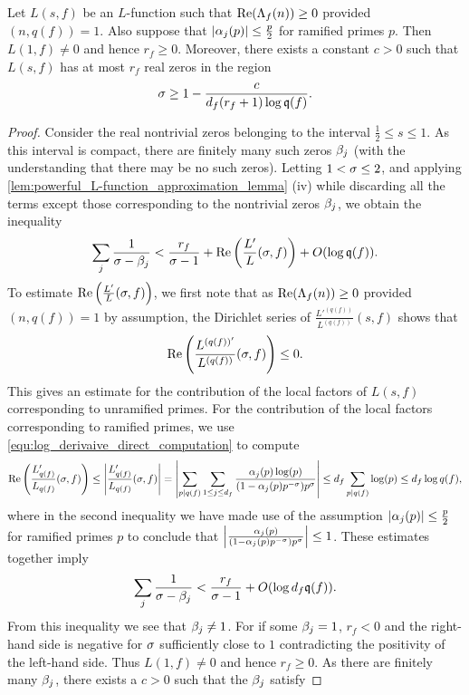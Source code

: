     \begin{lemma}\label{lem:non-vanshing_at_1_lemma}
      Let $L(s,f)$ be an $L$-function such that $\mathrm{Re}(\Lambda_{f}(n)) \ge 0$ provided $(n,q(f)) = 1$. Also suppose that $|\alpha_{j}(p)| \le \frac{p}{2}$ for ramified primes $p$. Then $L(1,f) \neq 0$ and hence $r_{f} \ge 0$. Moreover, there exists a constant $c > 0$ such that $L(s,f)$ has at most $r_{f}$ real zeros in the region
      \[
        \sigma \ge 1-\frac{c}{d_{f}(r_{f}+1)\log{\mathfrak{q}(f)}}.
      \]
    \end{lemma}
    \begin{proof}
      Consider the real nontrivial zeros belonging to the interval $\frac{1}{2} \le s \le 1$. As this interval is compact, there are finitely many such zeros $\beta_{j}$ (with the understanding that there may be no such zeros). Letting $1 < \sigma \le 2$, and applying \cref{lem:powerful_L-function_approximation_lemma} (iv) while discarding all the terms except those corresponding to the nontrivial zeros $\beta_{j}$, we obtain the inequality
      \[
        \sum_{j}\frac{1}{\sigma-\beta_{j}} < \frac{r_{f}}{\sigma-1}+\mathrm{Re}\left(\frac{L'}{L}(\sigma,f)\right)+O(\log{\mathfrak{q}(f)}).
      \]
      To estimate $\mathrm{Re}\left(\frac{L'}{L}(\sigma,f)\right)$, we first note that as $\mathrm{Re}(\Lambda_{f}(n)) \ge 0$ provided $(n,q(f)) = 1$ by assumption, the Dirichlet series of $\frac{L'^{(q(f))}}{L^{(q(f))}}(s,f)$ shows that
      \[
        \mathrm{Re}\left(\frac{L^{(q(f))'}}{L^{(q(f))}}(\sigma,f)\right) \le 0.
      \]
      This gives an estimate for the contribution of the local factors of $L(s,f)$ corresponding to unramified primes. For the contribution of the local factors corresponding to ramified primes, we use \cref{equ:log_derivaive_direct_computation} to compute
      \[
        \mathrm{Re}\left(\frac{L'_{q(f)}}{L_{q(f)}}(\sigma,f)\right) \le \left|\frac{L'_{q(f)}}{L_{q(f)}}(\sigma,f)\right| = \left|\sum_{p \mid q(f)}\sum_{1 \le j \le d_{f}}\frac{\alpha_{j}(p)\log(p)}{(1-\alpha_{j}(p)p^{-\sigma})p^{\sigma}}\right| \le d_{f}\sum_{p \mid q(f)}\log(p) \le d_{f}\log{q(f)},
      \]
      where in the second inequality we have made use of the assumption $|\alpha_{j}(p)| \le \frac{p}{2}$ for ramified primes $p$ to conclude that $\left|\frac{\alpha_{j}(p)}{(1-\alpha_{j}(p)p^{-\sigma})p^{\sigma}}\right| \le 1$. These estimates together imply
      \[
        \sum_{j}\frac{1}{\sigma-\beta_{j}} < \frac{r_{f}}{\sigma-1}+O(\log{d_{f}\mathfrak{q}(f)}).
      \]
      From this inequality we see that $\beta_{j} \neq 1$. For if some $\beta_{j} = 1$, $r_{f} < 0$ and the right-hand side is negative for $\sigma$ sufficiently close to $1$ contradicting the positivity of the left-hand side. Thus $L(1,f) \neq 0$ and hence $r_{f} \ge 0$. As there are finitely many $\beta_{j}$, there exists a $c > 0$ such that the $\beta_{j}$ satisfy

\end{proof}
